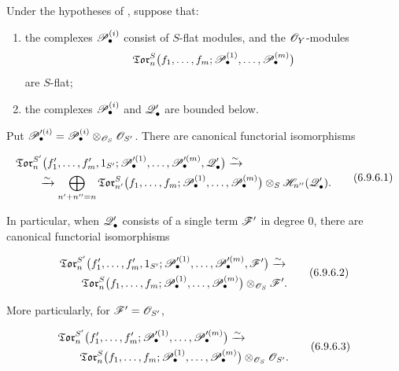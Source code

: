\begin{corollary}[6.9.6]
\label{III.6.9.6}
Under the hypotheses of , suppose that:
\begin{enumerate}
  \item[$1^\circ$] the complexes $\mathscr{P}_\bullet^{(i)}$ consist of
  $S$-flat modules, and the $\mathscr{O}_Y$-modules
  \[
    \mathfrak{Tor}_n^S
    \bigl(
      f_1,\ldots,f_m;
      \mathscr{P}_\bullet^{(1)},\ldots,\mathscr{P}_\bullet^{(m)}
    \bigr)
  \]
  are $S$-flat;
  \item[$2^\circ$] the complexes $\mathscr{P}_\bullet^{(i)}$ and
  $\mathscr{Q}_\bullet'$ are bounded below.
\end{enumerate}


Put $\mathscr{P}_\bullet^{\prime(i)}
=
\mathscr{P}_\bullet^{(i)}
\otimes_{\mathscr{O}_S}\mathscr{O}_{S'}$.
There are canonical functorial isomorphisms
\begin{env}[6.9.6.1]
\label{III.6.9.6.1}
\[
\begin{split}
  &
  \mathfrak{Tor}_n^{S'}
  \bigl(
    f_1',\ldots,f_m',1_{S'};
    \mathscr{P}_\bullet^{\prime(1)},\ldots,
    \mathscr{P}_\bullet^{\prime(m)},\mathscr{Q}_\bullet'
  \bigr)
  \xrightarrow{\sim}
  \\
  &\qquad\xrightarrow{\sim}
  \bigoplus_{n'+n''=n}
  \mathfrak{Tor}_{n'}^S
  \bigl(
    f_1,\ldots,f_m;
    \mathscr{P}_\bullet^{(1)},\ldots,\mathscr{P}_\bullet^{(m)}
  \bigr)
  \otimes_S
  \mathscr{H}_{n''}(\mathscr{Q}_\bullet').
\end{split}
  \tag{6.9.6.1}\label{III.6.9.6.1.eq}
\]
\end{env}

In particular, when $\mathscr{Q}_\bullet'$ consists of a single term
$\mathscr{F}'$ in degree $0$, there are canonical functorial
isomorphisms
\begin{env}[6.9.6.2]
\label{III.6.9.6.2}
\[
\begin{split}
  &
  \mathfrak{Tor}_n^{S'}
  \bigl(
    f_1',\ldots,f_m',1_{S'};
    \mathscr{P}_\bullet^{\prime(1)},\ldots,
    \mathscr{P}_\bullet^{\prime(m)},\mathscr{F}'
  \bigr)
  \xrightarrow{\sim}
  \\
  &\qquad
  \mathfrak{Tor}_n^S
  \bigl(
    f_1,\ldots,f_m;
    \mathscr{P}_\bullet^{(1)},\ldots,\mathscr{P}_\bullet^{(m)}
  \bigr)
  \otimes_{\mathscr{O}_S}\mathscr{F}'.
\end{split}
  \tag{6.9.6.2}\label{III.6.9.6.2.eq}
\]
\end{env}
More particularly, for $\mathscr{F}'=\mathscr{O}_{S'}$,
\begin{env}[6.9.6.3]
\label{III.6.9.6.3}
\[
\begin{split}
  &
  \mathfrak{Tor}_n^{S'}
  \bigl(
    f_1',\ldots,f_m';
    \mathscr{P}_\bullet^{\prime(1)},\ldots,
    \mathscr{P}_\bullet^{\prime(m)}
  \bigr)
  \xrightarrow{\sim}
  \\
  &\qquad
  \mathfrak{Tor}_n^S
  \bigl(
    f_1,\ldots,f_m;
    \mathscr{P}_\bullet^{(1)},\ldots,\mathscr{P}_\bullet^{(m)}
  \bigr)
  \otimes_{\mathscr{O}_S}\mathscr{O}_{S'}.
\end{split}
  \tag{6.9.6.3}\label{III.6.9.6.3.eq}
\]
\end{env}
\end{corollary}

